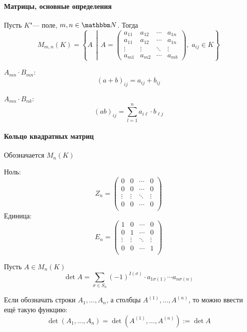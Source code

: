 \documentclass[12pt]{../../../notes}
\begin{document}
\paragraph{Матрицы, основные определения}
\begin{defn}\label{defn:matrices}
  Пусть $K$"--- поле, $m,n\in \N$. Тогда
  \[
    M_{m,n}(K) = 
    \left\{
      A 
    \,\middle|\,
      A  = 
      \begin{pmatrix}
        a_{11} & a_{12} & \cdots & a_{1n} \\
        a_{11} & a_{12} & \cdots & a_{1n} \\
        \vdots & \vdots & \ddots & \vdots \\
        a_{m1} & a_{m2} & \cdots & a_{mb}
      \end{pmatrix},\;
      a_{ij} \in K
    \right\}
  \]
\end{defn}

\begin{defn}\label{defn:matradd}
  $A_{mn}\cdot B_{mn}:$
  \[
    (a+b)_{ij} = a_{ij} + b_{ij}
  \]
\end{defn}

\begin{defn}\label{defn:matrmul}
  $A_{mn}\cdot B_{nk}:$
  \[
    (ab)_{ij} = \sum_{l=1}^n a_{i\ell}\cdot b_{\ell j}
  \]
\end{defn}

\paragraph{Кольцо квадратных матриц}
Обозначается $M_n(K)$

\noindent Ноль:
\[
  Z_n = 
  \begin{pmatrix}
    0      & 0      & \cdots & 0 \\
    0      & 0      & \cdots & 0 \\
    \vdots & \vdots & \ddots & \vdots \\
    0      & 0      & \cdots & 0 \\
  \end{pmatrix}
\]
Единица:
\[
  E_n = 
  \begin{pmatrix}
    1      & 0      & \cdots & 0 \\
    0      & 1      & \cdots & 0 \\
    \vdots & \vdots & \ddots & \vdots \\
    0      & 0      & \cdots & 1 \\
  \end{pmatrix}
\]
\begin{defn}\label{defn:determinant}
  Пусть $A\in M_n(K)$
  \[
    \det A = \sum_{\sigma \in S_n} (-1)^{I(\sigma)} \cdot a_{1\sigma(1)} \dotsm a_{n\sigma(n)}
  \]
\end{defn}
\begin{defn}\label{defn:determrows}
  Если обозначать строки $A_1, \dotsc , A_n$, а столбцы $A^{(1)}, \dotsc , A^{(n)}$,
  то можно ввести ещё такую функцию:
  \[
    \det (A_1, \dotsc , A_n) = \det (A^{(1)}, \dotsc , A^{(n)}) := \det A
  \]
\end{defn}
\end{document}
